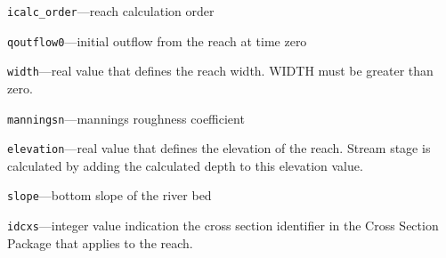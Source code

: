 \begin{description}
\item \texttt{icalc\_order}---reach calculation order

\item \texttt{qoutflow0}---initial outflow from the reach at time zero

\item \texttt{width}---real value that defines the reach width. WIDTH must be greater than zero.

\item \texttt{manningsn}---mannings roughness coefficient

\item \texttt{elevation}---real value that defines the elevation of the reach.  Stream stage is calculated by adding the calculated depth to this elevation value.

\item \texttt{slope}---bottom slope of the river bed

\item \texttt{idcxs}---integer value indication the cross section identifier in the Cross Section Package that applies to the reach.

\end{description}

